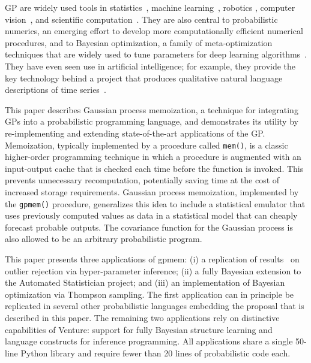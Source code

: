 \ac{GP} are widely used tools in statistics~\citep{barry1986nonparametric}, machine learning~\citep{neal1995bayesian,williams1998bayesian,kuss2005assessing,rasmussen2006gaussian,damianou2013deep}, robotics \citep{ferris2006gaussian}, computer vision~\citep{kemmler2013one}, and scientific computation~\citep{kennedy2001bayesian,schneider2008simulations,kwan2013cosmic}.
They are also central to probabilistic numerics, an emerging effort to develop more computationally efficient numerical procedures, and to Bayesian optimization, a family of meta-optimization techniques that are widely used to tune parameters for deep learning algorithms~\citep{snoek2012practical,gelbart2014bayesian}. They have even seen use in artificial intelligence; for example, they provide the key technology behind a project that produces qualitative natural language descriptions of time series~\citep{duvenaud2013structure,lloyd2014automatic}.

This paper describes Gaussian process memoization, a technique for integrating \ac{GP}s into a probabilistic programming language, and demonstrates its utility by re-implementing and extending state-of-the-art applications of the GP. Memoization, typically implemented by a procedure called {\tt mem()}, is a classic higher-order programming technique in which a procedure is augmented with an input-output cache that is checked each time before the function is invoked. This prevents unnecessary recomputation, potentially saving time at the cost of increased storage requirements. Gaussian process memoization, implemented by the {\tt gpmem()} procedure, generalizes this idea to include a statistical emulator that uses previously computed values as data in a statistical model that can cheaply forecast probable outputs. The covariance function for the Gaussian process is also allowed to be an arbitrary probabilistic program.

This paper presents three applications of gpmem: (i) a replication of results~\citet{neal1997monte} on outlier rejection via hyper-parameter inference; (ii) a fully Bayesian extension to the Automated Statistician project; and (iii) an implementation of Bayesian optimization via Thompson sampling. The first application can in principle be replicated in several other probabilistic languages embedding the proposal that is described in this paper. The remaining two applications rely on distinctive capabilities of Venture: support for fully Bayesian structure learning and language constructs for inference programming. All applications share a single 50-line Python library and require fewer than 20 lines of probabilistic code each.



